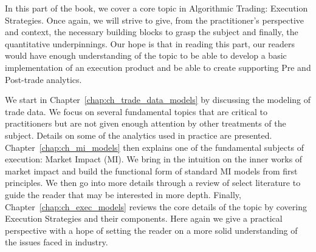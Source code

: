 
In this part of the book, we cover a core topic in Algorithmic Trading: Execution Strategies. Once again, we will strive to give, from the practitioner's perspective and context, the necessary building blocks to grasp the subject and finally, the quantitative underpinnings. Our hope is that in reading this part, our readers would have enough understanding of the topic to be able to develop a basic implementation of an execution product and be able to create supporting Pre and Post-trade analytics.


We start in Chapter~\ref{chap:ch_trade_data_models} by discussing the modeling of trade data. We focus on several fundamental topics that are critical to practitioners but are not given enough attention by other treatments of the subject. Details on some of the analytics used in practice are presented. Chapter~\ref{chap:ch_mi_models} then explains one of the fundamental subjects of execution: Market Impact (MI). We bring in the intuition on the inner works of market impact and build the functional form of standard MI models from first principles. We then go into more details through a review of select literature to guide the reader that may be interested in more depth. Finally, Chapter~\ref{chap:ch_exec_models} reviews the core details of the topic by covering Execution Strategies and their components. Here again we give a practical perspective with a hope of setting the reader on a more solid understanding of the issues faced in industry.
